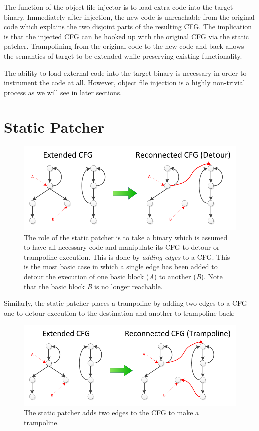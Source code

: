 The function of the object file injector is to load extra code into the target binary. Immediately after injection, the new code is unreachable from the original code which explains the two disjoint parts of the resulting CFG. The implication is that the injected CFG can be hooked up with the original CFG via the static patcher. Trampolining from the original code to the new code and back allows the semantics of target to be extended while preserving existing functionality.

The ability to load external code into the target binary is necessary in order to instrument the code at all. However, object file injection is a highly non-trivial process as we will see in later sections.

\section{Static Patcher}

\begin{figure}[H]
 \centering
 \includegraphics{Static_Patcher_Detour.pdf}
 \caption[Static Patcher Detour]{The role of the static patcher is to take a binary which is assumed to have all necessary code and manipulate its CFG to detour or trampoline execution. This is done by \emph{adding edges} to a CFG. This is the most basic case in which a single edge has been added to detour the execution of one basic block (\emph{A}) to another (\emph{B}). Note that the basic block \emph{B} is no longer reachable.}
\end{figure}

Similarly, the static patcher places a trampoline by adding two edges to a CFG - one to detour execution to the destination and another to trampoline back:

\begin{figure}[H]
 \centering
 \includegraphics{Static_Patcher_Trampoline.pdf}
 \caption[Static Patcher Trampoline]{The static patcher adds two edges to the CFG to make a trampoline.}
\end{figure}

